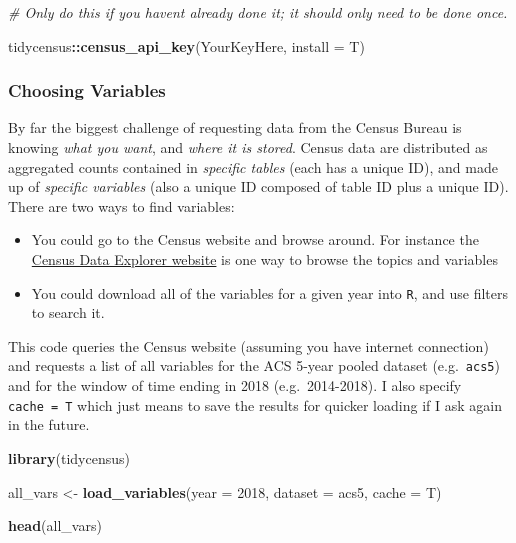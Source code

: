 \documentclass[
]{book}
\newenvironment{Shaded}{\begin{snugshade}}{\end{snugshade}}
\newcommand{\AttributeTok}[1]{\textcolor[rgb]{0.13,0.29,0.53}{#1}}
\newcommand{\CommentTok}[1]{\textcolor[rgb]{0.56,0.35,0.01}{\textit{#1}}}
\newcommand{\DecValTok}[1]{\textcolor[rgb]{0.00,0.00,0.81}{#1}}
\newcommand{\FunctionTok}[1]{\textcolor[rgb]{0.13,0.29,0.53}{\textbf{#1}}}
\newcommand{\NormalTok}[1]{#1}
\newcommand{\OtherTok}[1]{\textcolor[rgb]{0.56,0.35,0.01}{#1}}
\newcommand{\SpecialCharTok}[1]{\textcolor[rgb]{0.81,0.36,0.00}{\textbf{#1}}}
\newcommand{\StringTok}[1]{\textcolor[rgb]{0.31,0.60,0.02}{#1}}
\providecommand{\tightlist}{%
  \setlength{\itemsep}{0pt}\setlength{\parskip}{0pt}}
\begin{document}
\begin{Shaded}
\begin{Highlighting}[]
\CommentTok{\# Only do this if you haven\textquotesingle{}t already done it; it should only need to be done once.}

\NormalTok{tidycensus}\SpecialCharTok{::}\FunctionTok{census\_api\_key}\NormalTok{(}\StringTok{\textquotesingle{}YourKeyHere\textquotesingle{}}\NormalTok{, }\AttributeTok{install =}\NormalTok{ T) }
\end{Highlighting}
\end{Shaded}

\hypertarget{choosing-variables}{%
\subsubsection{Choosing Variables}\label{choosing-variables}}

By far the biggest challenge of requesting data from the Census Bureau is knowing \emph{what you want}, and \emph{where it is stored}. Census data are distributed as aggregated counts contained in \emph{specific tables} (each has a unique ID), and made up of \emph{specific variables} (also a unique ID composed of table ID plus a unique ID). There are two ways to find variables:

\begin{itemize}
\tightlist
\item
  You could go to the Census website and browse around. For instance the \href{https://data.census.gov/cedsci/}{Census Data Explorer website} is one way to browse the topics and variables
\item
  You could download all of the variables for a given year into \texttt{R}, and use filters to search it.
\end{itemize}

This code queries the Census website (assuming you have internet connection) and requests a list of all variables for the ACS 5-year pooled dataset (e.g.~\texttt{acs5}) and for the window of time ending in 2018 (e.g.~2014-2018). I also specify \texttt{cache\ =\ T} which just means to save the results for quicker loading if I ask again in the future.

\begin{Shaded}
\begin{Highlighting}[]
\FunctionTok{library}\NormalTok{(tidycensus)}

\NormalTok{all\_vars }\OtherTok{\textless{}{-}} \FunctionTok{load\_variables}\NormalTok{(}\AttributeTok{year =} \DecValTok{2018}\NormalTok{, }\AttributeTok{dataset =} \StringTok{\textquotesingle{}acs5\textquotesingle{}}\NormalTok{, }\AttributeTok{cache =}\NormalTok{ T)}

\FunctionTok{head}\NormalTok{(all\_vars)}
\end{Highlighting}
\end{Shaded}
\end{document}
